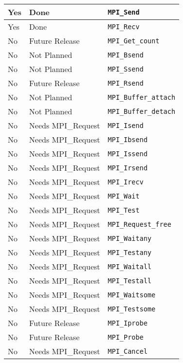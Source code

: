 \documentclass{report}
\begin{document}
\begin{tabular}{|l|l|l|}
Yes            & Done               & \verb|MPI_Send| \\ \hline
Yes            & Done               & \verb|MPI_Recv| \\ \hline
No             & Future Release     & \verb|MPI_Get_count| \\ \hline
No             & Not Planned        & \verb|MPI_Bsend| \\ \hline
No             & Not Planned        & \verb|MPI_Ssend| \\ \hline
No             & Future Release     & \verb|MPI_Rsend| \\ \hline
No             & Not Planned        & \verb|MPI_Buffer_attach| \\ \hline
No             & Not Planned        & \verb|MPI_Buffer_detach| \\ \hline
No             & Needs MPI\_Request & \verb|MPI_Isend| \\ \hline
No             & Needs MPI\_Request & \verb|MPI_Ibsend| \\ \hline
No             & Needs MPI\_Request & \verb|MPI_Issend| \\ \hline
No             & Needs MPI\_Request & \verb|MPI_Irsend| \\ \hline
No             & Needs MPI\_Request & \verb|MPI_Irecv| \\ \hline
No             & Needs MPI\_Request & \verb|MPI_Wait| \\ \hline
No             & Needs MPI\_Request & \verb|MPI_Test| \\ \hline
No             & Needs MPI\_Request & \verb|MPI_Request_free| \\ \hline
No             & Needs MPI\_Request & \verb|MPI_Waitany| \\ \hline
No             & Needs MPI\_Request & \verb|MPI_Testany| \\ \hline
No             & Needs MPI\_Request & \verb|MPI_Waitall| \\ \hline
No             & Needs MPI\_Request & \verb|MPI_Testall| \\ \hline
No             & Needs MPI\_Request & \verb|MPI_Waitsome| \\ \hline
No             & Needs MPI\_Request & \verb|MPI_Testsome| \\ \hline
No             & Future Release     & \verb|MPI_Iprobe| \\ \hline
No             & Future Release     & \verb|MPI_Probe| \\ \hline
No             & Needs MPI\_Request & \verb|MPI_Cancel| \\ \hline

\end{tabular}
\end{document}
